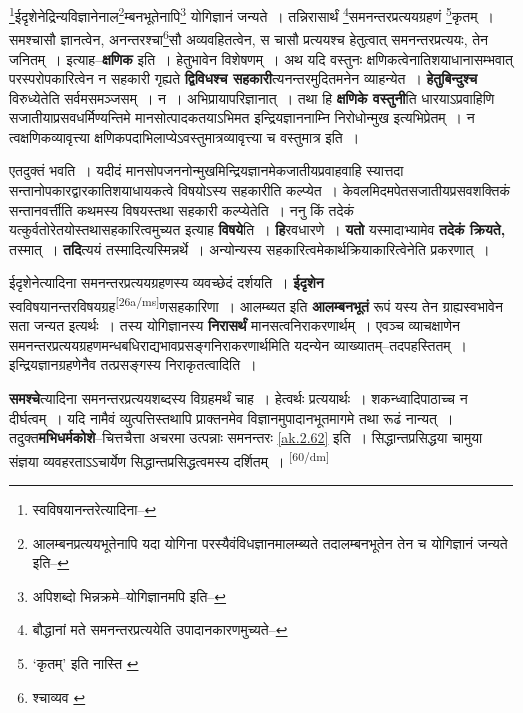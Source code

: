 \documentclass[article,12pt,a4paper]{memoir}
\begin{document}
	\footnote{स्वविषयानन्तरेत्यादिना--\cite{dp-msD-n}}ईदृशेनेद्रिन्यविज्ञानेनाल\footnote{आलम्बनप्रत्ययभूतेनापि \cite{dp-msA} \cite{dp-msB} \cite{dp-msC} \cite{dp-msD} \cite{dp-edP} \cite{dp-edH} \cite{dp-edE} \cite{dp-edN} यदा योगिना परस्यैवंविधज्ञानमालम्ब्यते तदालम्बनभूतेन तेन च योगिज्ञानं जन्यते इति--\cite{dp-msD-n}}म्बनभूतेनापि\footnote{अपिशब्दो भिन्नक्रमे--योगिज्ञानमपि इति--\cite{dp-msD-n}} योगिज्ञानं जन्यते । तन्निरासार्थं \footnote{बौद्धानां मते समनन्तरप्रत्ययेति उपादानकारणमुच्यते--\cite{dp-msD-n}}समनन्तरप्रत्ययग्रहणं \footnote{‘कृतम्’ इति नास्ति \cite{dp-msD} \cite{dp-msB}}कृतम् । समश्चासौ ज्ञानत्वेन, अनन्तरश्चा\footnote{श्चाव्यव \cite{dp-msD} \cite{dp-msB}}सौ अव्यवहितत्वेन, स चासौ प्रत्ययश्च हेतुत्वात् समनन्तरप्रत्ययः, तेन जनितम् । इत्याह--\textbf{क्षणिक} इति । हेतुभावेन विशेषणम् । अथ यदि वस्तुनः क्षणिकत्वेनातिशयाधानासम्भवात् परस्परोपकारित्वेन न सहकारी गृह्यते \textbf{द्विविधश्च सहकारी}त्यनन्तरमुदितमनेन व्याहन्येत । \textbf{हेतुबिन्दुश्च} विरुध्येतेति सर्वमसमञ्जसम् । न । अभिप्रायापरिज्ञानात् । तथा हि \textbf{क्षणिके वस्तुनी}ति धारयाऽप्रवाहिणि सजातीयाप्रसवधर्मिण्यन्तिमे मानसोत्पादकतयाऽभिमत इन्द्रियज्ञाननाम्नि निरोधोन्मुख इत्यभिप्रेतम् । न त्वक्षणिकव्यावृत्त्या क्षणिकपदाभिलाप्येऽवस्तुमात्रव्यावृत्त्या च वस्तुमात्र इति ।
	\pend
      

	  \pstart एतदुक्तं भवति । यदीदं मानसोपजननोन्मुखमिन्द्रियज्ञानमेकजातीयप्रवाहवाहि स्यात्तदा सन्तानोपकारद्वारकातिशयाधायकत्वे विषयोऽस्य सहकारीति कल्प्येत । केवलमिदमपेतसजातीयप्रसवशक्तिकं सन्तानवर्त्तीति कथमस्य विषयस्तथा सहकारी कल्प्येतेति । ननु किं तदेकं यत्कुर्वतोरेतयोस्तथासहकारित्वमुच्यत इत्याह \textbf{विषये}ति । \textbf{हि}रवधारणे । \textbf{यतो} यस्मादाभ्यामेव \textbf{तदेकं क्रियते,} तस्मात् । \textbf{तदि}त्ययं तस्मादित्यस्मिन्नर्थे । अन्योन्यस्य सहकारित्वमेकार्थक्रियाकारित्वेनेति प्रकरणात् ।
	\pend
      

	  \pstart ईदृशेनेत्यादिना समनन्तरप्रत्ययग्रहणस्य व्यवच्छेदं दर्शयति । \textbf{ईदृशेन} स्वविषयानन्तरविषयग्रह\leavevmode\textsuperscript{\rmlatinfont\tiny [26a/ms]}णसहकारिणा । आलम्ब्यत इति \textbf{आलम्बनभूतं} रूपं यस्य तेन ग्राह्यस्वभावेन सता जन्यत इत्यर्थः । तस्य योगिज्ञानस्य \textbf{निरासर्थं} मानसत्वनिराकरणार्थम् । एवञ्च व्याचक्षाणेन समनन्तरप्रत्ययग्रहणमन्धबधिराद्यभावप्रसङ्गनिराकरणार्थमिति यदन्येन व्याख्यातम्--तदपहस्तितम् । इन्द्रियज्ञानग्रहणेनैव तत्प्रसङ्गस्य निराकृतत्वादिति ।
	\pend
      

	  \pstart \textbf{समश्चे}त्यादिना समनन्तरप्रत्ययशब्दस्य विग्रहमर्थं चाह । हेत्वर्थः प्रत्ययार्थः । शकन्ध्वादिपाठाच्च न दीर्घत्वम् । यदि नामैवं व्युत्पत्तिस्तथापि प्राक्तनमेव विज्ञानमुपादानभूतमागमे तथा रूढं नान्यत् । तदुक्त\textbf{मभिधर्मकोशे}--चित्तचैत्ता अचरमा उत्पन्नाः समनन्तरः \cref{ak.2.62} इति । सिद्धान्तप्रसिद्धया चामुया संज्ञया व्यवहरताऽऽचार्येण सिद्धान्तप्रसिद्धत्वमस्य दर्शितम् ।
	\pend
      \leavevmode\textsuperscript{\rmlatinfont\tiny [60/dm]}
\end{document}
